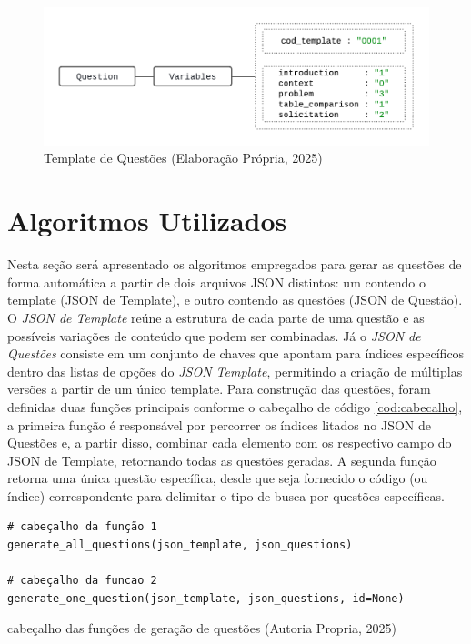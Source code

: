 \begin{figure}[ht]
	\centering
	\includegraphics[width=14cm]{./imagens/capitulo5/template-2}
	\caption{Template de Questões (Elaboração Própria, 2025) }
	\label{fig:template-2}
\end{figure}

\section{Algoritmos Utilizados}

Nesta seção será apresentado os algoritmos empregados para gerar as questões de forma automática a partir de dois arquivos JSON distintos: um contendo o template (JSON de Template), e outro contendo as questões (JSON de Questão). O \textit{JSON de Template} reúne a estrutura de cada parte de uma questão e as possíveis variações de conteúdo que podem ser combinadas. Já o \textit{JSON de Questões} consiste em um conjunto de chaves que apontam para índices específicos dentro das listas de opções do \textit{JSON Template}, permitindo a criação de múltiplas versões a partir de um único template. 
Para construção das questões, foram definidas duas funções principais conforme o cabeçalho de código \ref{cod:cabecalho}, a primeira função é responsável por percorrer os índices litados no JSON de Questões e, a partir disso, combinar cada elemento com os respectivo campo do JSON de Template, retornando todas as questões geradas. A segunda função retorna uma única questão específica, desde que seja fornecido o código (ou índice) correspondente para delimitar o tipo de busca por questões específicas.


\begin{listing}[ht]
\begin{verbatim}
# cabeçalho da função 1
generate_all_questions(json_template, json_questions)

# cabeçalho da funcao 2
generate_one_question(json_template, json_questions, id=None) 
\end{verbatim}
\caption{cabeçalho das funções de geração de questões (Autoria Propria, 2025)}
\label{cod:cabecalho}
\end{listing}


